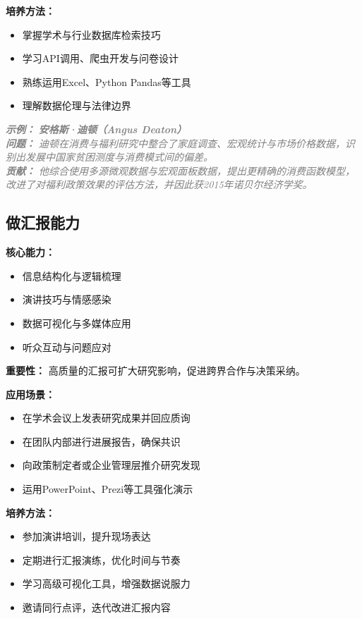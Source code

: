 \documentclass[lang=cn,12pt,a4paper]{elegantpaper}
\newcommand{\skillexample}[1]{\smallskip\noindent\textcolor{gray}{\textit{\footnotesize\textbf{示例：}} \textit{\footnotesize #1}}}
\begin{document}
\textbf{培养方法：}
\begin{itemize}
    \item 掌握学术与行业数据库检索技巧
    \item 学习API调用、爬虫开发与问卷设计
    \item 熟练运用Excel、Python Pandas等工具
    \item 理解数据伦理与法律边界
\end{itemize}

\skillexample{%
\textbf{安格斯·迪顿（Angus Deaton）}\\
\textbf{问题：} 迪顿在消费与福利研究中整合了家庭调查、宏观统计与市场价格数据，识别出发展中国家贫困测度与消费模式间的偏差。\\
\textbf{贡献：} 他综合使用多源微观数据与宏观面板数据，提出更精确的消费函数模型，改进了对福利政策效果的评估方法，并因此获2015年诺贝尔经济学奖。}

\subsection{做汇报能力}\label{sec:reporting}
\textbf{核心能力：} 
\begin{itemize}
    \item 信息结构化与逻辑梳理
    \item 演讲技巧与情感感染
    \item 数据可视化与多媒体应用
    \item 听众互动与问题应对
\end{itemize}

\textbf{重要性：} 高质量的汇报可扩大研究影响，促进跨界合作与决策采纳。

\textbf{应用场景：} 
\begin{itemize}
    \item 在学术会议上发表研究成果并回应质询
    \item 在团队内部进行进展报告，确保共识
    \item 向政策制定者或企业管理层推介研究发现
    \item 运用PowerPoint、Prezi等工具强化演示
\end{itemize}

\textbf{培养方法：} 
\begin{itemize}
    \item 参加演讲培训，提升现场表达
    \item 定期进行汇报演练，优化时间与节奏
    \item 学习高级可视化工具，增强数据说服力
    \item 邀请同行点评，迭代改进汇报内容
\end{itemize}
\end{document}
